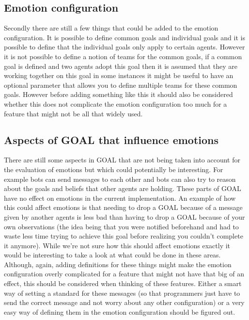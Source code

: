 \documentclass[11pt]{article}
\begin{document}
\subsection{Emotion configuration}
Secondly there are still a few things that could be added to the emotion configuration. It is possible to define common goals and individual goals and it is possible to define that the individual goals only apply to certain agents. However it is not possible to define a notion of teams for the common goals, if a common goal is defined and two agents adopt this goal then it is assumed that they are working together on this goal in some instances it might be useful to have an optional parameter that allows you to define multiple teams for these common goals. However before adding something like this it should also be considered whether this does not complicate the emotion configuration too much for a feature that might not be all that widely used.

\subsection{Aspects of GOAL that influence emotions}
There are still some aspects in GOAL that are not being taken into account for the evaluation of emotions but which could potentially be interesting. For example bots can send messages to each other and bots can also try to reason about the goals and beliefs that other agents are holding. These parts of GOAL have no effect on emotions in the current implementation. An example of how this could affect emotions is that needing to drop a GOAL because of a message given by another agents is less bad than having to drop a GOAL because of your own observations (the idea being that you were notified beforehand and had to waste less time trying to achieve this goal before realizing you couldn't complete it anymore). While we're not sure how this should affect emotions exactly it would be interesting to take a look at what could be done in these areas. Although, again, adding definitions for these things might make the emotion configuration overly complicated for a feature that might not have that big of an effect, this should be considered when thinking of these features. Either a smart way of setting a standard for these messages (so that programmers just have to send the correct message and not worry about any other configuration) or a very easy way of defining them in the emotion configuration should be figured out.
\end{document}
